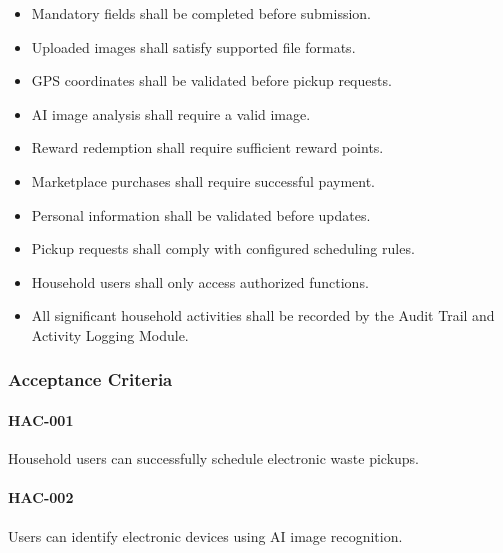 \begin{itemize}

\item Mandatory fields shall be completed before submission.

\item Uploaded images shall satisfy supported file formats.

\item GPS coordinates shall be validated before pickup requests.

\item AI image analysis shall require a valid image.

\item Reward redemption shall require sufficient reward points.

\item Marketplace purchases shall require successful payment.

\item Personal information shall be validated before updates.

\item Pickup requests shall comply with configured scheduling rules.

\item Household users shall only access authorized functions.

\item All significant household activities shall be recorded by the
Audit Trail and Activity Logging Module.

\end{itemize}


\subsubsection*{Acceptance Criteria}

\paragraph{HAC-001}

Household users can successfully schedule electronic waste pickups.

\paragraph{HAC-002}

Users can identify electronic devices using AI image recognition.

